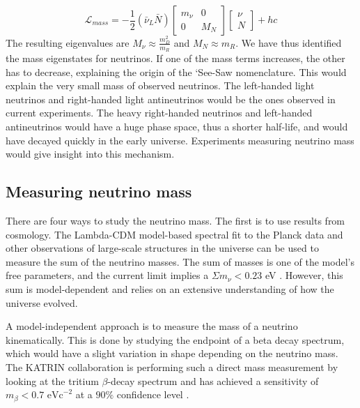 \begin{equation}\label{mass_lagrangian_reduced}
\mathcal{L}_{mass} = -\frac{1}{2}(\bar{\nu}_L\bar{N}) \begin{bmatrix} m_\nu & 0 \\ 0 & M_N \end{bmatrix} \begin{bmatrix} \nu \\ N \end{bmatrix} + hc
\end{equation}
\noindent
The resulting eigenvalues are $M_\nu \approx \frac{m^2_D}{m_R}$ and $M_N \approx m_R$. We have thus identified the mass eigenstates for neutrinos. If one of the mass terms increases, the other has to decrease, explaining the origin of the `See-Saw nomenclature. This would explain the very small mass of observed neutrinos. The left-handed light neutrinos and right-handed light antineutrinos would be the ones observed in current experiments. The heavy right-handed neutrinos and left-handed antineutrinos would have a huge phase space, thus a shorter half-life, and would have decayed quickly in the early universe. Experiments measuring neutrino mass would give insight into this mechanism. 

\subsection{Measuring neutrino mass}

There are four ways to study the neutrino mass. The first is to use results from cosmology. The Lambda-CDM model-based spectral fit to the Planck data and other observations of large-scale structures in the universe can be used to measure the sum of the neutrino masses. The sum of masses is one of the model's free parameters, and the current limit implies a $\Sigma m_\nu<0.23$ eV \cite{Planck_2015fie}. However, this sum is model-dependent and relies on an extensive understanding of how the universe evolved. 

A model-independent approach is to measure the mass of a neutrino kinematically. This is done by studying the endpoint of a beta decay spectrum, which would have a slight variation in shape depending on the neutrino mass. The KATRIN collaboration is performing such a direct mass measurement by looking at the tritium $\beta$-decay spectrum and has achieved a sensitivity of $m_\beta < 0.7 \text{ eVc}^{-2}$ at a $90\%$ confidence level \cite{KATRIN:2022}.


